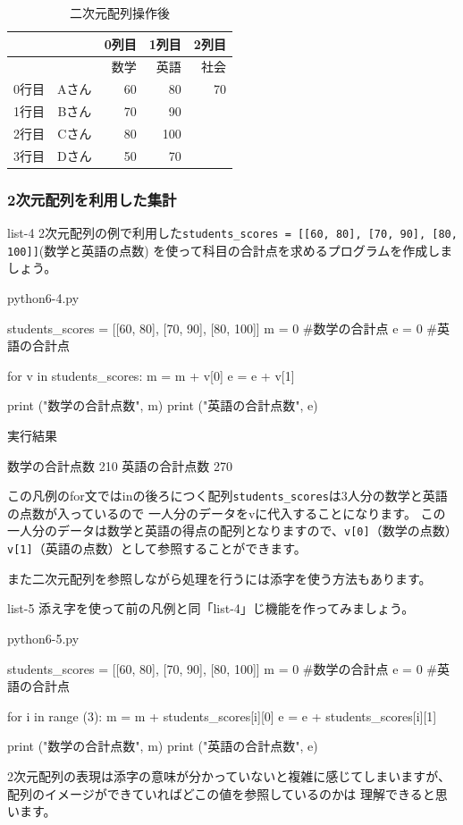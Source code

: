 \documentclass[11pt,a4paper,dvipdfmx,titlepage]{jsreport}
\begin{document}
\begin{table}[h]
 \begin{center}
    \caption{二次元配列操作後}
\begin{tabular}{r|c|r|r|r|} 
 & & 0列目 &1列目& 2列目\\ \hline 
 & &数学&英語&社会\\ \hline \hline
0行目 &Aさん &  60& 80 & 70 \\ \hline
1行目 &Bさん &  70& 90 & \\ \hline
2行目 &Cさん &  80& 100 & \\ \hline
3行目 &Dさん &  50& 70 & \\ \hline
\end{tabular}
\end{center}
\end{table}

\newpage
\subsubsection{2次元配列を利用した集計}
\begin{pabox}{list-4}
2次元配列の例で利用した{\tt students\_scores = [[60, 80], [70, 90], [80, 100]]}(数学と英語の点数)
を使って科目の合計点を求めるプログラムを作成しましょう。


\begin{legbox}{python6-4.py}
\begin{listing}{1}
students_scores = [[60, 80], [70, 90], [80, 100]]
m = 0 #数学の合計点
e = 0 #英語の合計点

for v in students_scores:
    m = m + v[0]
    e = e + v[1]

print ("数学の合計点数", m)
print ("英語の合計点数", e)
\end{listing}
実行結果
\begin{listing}{1}
数学の合計点数 210
英語の合計点数 270
\end{listing}
\end{legbox}
この凡例のfor文ではinの後ろにつく配列{\tt students\_scores}は3人分の数学と英語の点数が入っているので
一人分のデータをvに代入することになります。
この一人分のデータは数学と英語の得点の配列となりますので、{\tt v[0]}（数学の点数）{\tt v[1]}（英語の点数）として参照することができます。
\end{pabox}
\newpage
また二次元配列を参照しながら処理を行うには添字を使う方法もあります。
\begin{pabox}{list-5}
添え字を使って前の凡例と同「list-4」じ機能を作ってみましょう。


\begin{legbox}{python6-5.py}
\begin{listing}{1}
students_scores = [[60, 80], [70, 90], [80, 100]]
m = 0 #数学の合計点
e = 0 #英語の合計点

for i in range (3):
    m = m + students_scores[i][0]
    e = e + students_scores[i][1]

print ("数学の合計点数", m)
print ("英語の合計点数", e)
\end{listing}
\end{legbox}
2次元配列の表現は添字の意味が分かっていないと複雑に感じてしまいますが、配列のイメージができていればどこの値を参照しているのかは
理解できると思います。
\end{pabox}
\end{document}

